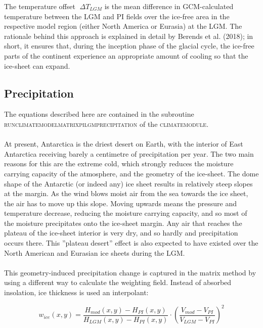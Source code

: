 \documentclass{article}
\begin{document}
The temperature offset $􏰀\Delta T_{LGM}$ is the mean difference in GCM-calculated temperature between the LGM and PI fields over the ice-free area in the respective model region (either North America or Eurasia) at the LGM. The rationale behind this approach is explained in detail by Berends et al. (2018); in short, it ensures that, during the inception phase of the glacial cycle, the ice-free parts of the continent experience an appropriate amount of cooling so that the ice-sheet can expand.\\

\subsection{Precipitation}

The equations described here are contained in the subroutine \textsc{run\textunderscore climate\textunderscore model\textunderscore matrix\textunderscore pi\textunderscore lgm\textunderscore precipitation} of the \textsc{climate\textunderscore module}.\\
\\
At present, Antarctica is the driest desert on Earth, with the interior of East Antarctica receiving barely a centimetre of precipitation per year. The two main reasons for this are the extreme cold, which strongly reduces the moisture carrying capacity of the atmosphere, and the geometry of the ice-sheet. The dome shape of the Antarctic (or indeed any) ice sheet results in relatively steep slopes at the margin. As the wind blows moist air from the sea towards the ice sheet, the air has to move up this slope. Moving upwards means the pressure and temperature decrease, reducing the moisture carrying capacity, and so most of the moisture precipitates onto the ice-sheet margin. Any air that reaches the plateau of the ice-sheet interior is very dry, and so hardly and precipitation occurs there. This ''plateau desert'' effect is also expected to have existed over the North American and Eurasian ice sheets during the LGM.\\
\\
This geometry-induced precipitation change is captured in the matrix method by using a different way to calculate the weighting field. Instead of absorbed insolation, ice thickness is used an interpolant:

\begin{equation} \label{eq:matrix_wice_precip}
w_{ice} (x,y) = \frac{H_{mod}(x,y) - H_{PI}(x,y)}{H_{LGM}(x,y) - H_{PI}(x,y)} \cdot
\left( \frac{V_{mod} - V_{PI}}{V_{LGM} - V_{PI}} \right)^2
\end{equation}
\end{document}
